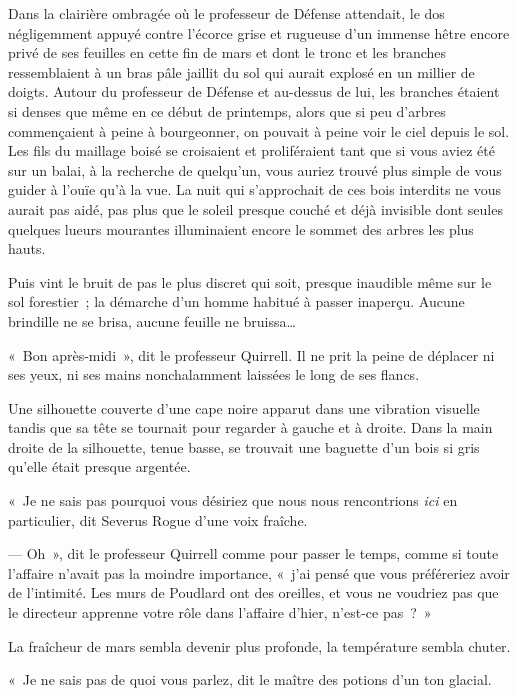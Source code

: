 
Dans la clairière ombragée où le professeur de Défense attendait, le dos négligemment appuyé contre l'écorce grise et rugueuse d'un immense hêtre encore privé de ses feuilles en cette fin de mars et dont le tronc et les branches ressemblaient à un bras pâle jaillit du sol qui aurait explosé en un millier de doigts. Autour du professeur de Défense et au-dessus de lui, les branches étaient si denses que même en ce début de printemps, alors que si peu d'arbres commençaient à peine à bourgeonner, on pouvait à peine voir le ciel depuis le sol. Les fils du maillage boisé se croisaient et proliféraient tant que si vous aviez été sur un balai, à la recherche de quelqu'un, vous auriez trouvé plus simple de vous guider à l'ouïe qu'à la vue. La nuit qui s'approchait de ces bois interdits ne vous aurait pas aidé, pas plus que le soleil presque couché et déjà invisible dont seules quelques lueurs mourantes illuminaient encore le sommet des arbres les plus hauts.

Puis vint le bruit de pas le plus discret qui soit, presque inaudible même sur le sol forestier~; la démarche d'un homme habitué à passer inaperçu. Aucune brindille ne se brisa, aucune feuille ne bruissa…

«~Bon après-midi~», dit le professeur Quirrell. Il ne prit la peine de déplacer ni ses yeux, ni ses mains nonchalamment laissées le long de ses flancs.

Une silhouette couverte d'une cape noire apparut dans une vibration visuelle tandis que sa tête se tournait pour regarder à gauche et à droite. Dans la main droite de la silhouette, tenue basse, se trouvait une baguette d'un bois si gris qu'elle était presque argentée.

«~Je ne sais pas pourquoi vous désiriez que nous nous rencontrions \emph{ici} en particulier, dit Severus Rogue d'une voix fraîche.

--- Oh~», dit le professeur Quirrell comme pour passer le temps, comme si toute l'affaire n'avait pas la moindre importance, «~j'ai pensé que vous préféreriez avoir de l'intimité. Les murs de Poudlard ont des oreilles, et vous ne voudriez pas que le directeur apprenne votre rôle dans l'affaire d'hier, n'est-ce pas~?~»

La fraîcheur de mars sembla devenir plus profonde, la température sembla chuter.

«~Je ne sais pas de quoi vous parlez, dit le maître des potions d'un ton glacial.

